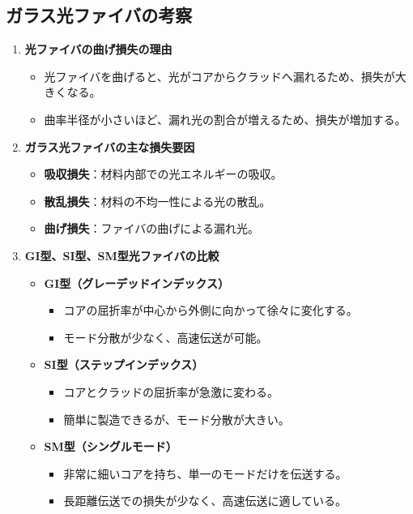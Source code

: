 \documentclass[a4paper,11pt,xelatex,ja=standard]{bxjsarticle}
\begin{document}
\subsection{ガラス光ファイバの考察}

\begin{enumerate}

    \item \textbf{光ファイバの曲げ損失の理由}
    \begin{itemize}
        \item 光ファイバを曲げると、光がコアからクラッドへ漏れるため、損失が大きくなる。
        \item 曲率半径が小さいほど、漏れ光の割合が増えるため、損失が増加する。
    \end{itemize}

    \item \textbf{ガラス光ファイバの主な損失要因}
    \begin{itemize}
        \item \textbf{吸収損失}：材料内部での光エネルギーの吸収。
        \item \textbf{散乱損失}：材料の不均一性による光の散乱。
        \item \textbf{曲げ損失}：ファイバの曲げによる漏れ光。
    \end{itemize}

    \item \textbf{GI型、SI型、SM型光ファイバの比較}
    \begin{itemize}
        \item \textbf{GI型（グレーデッドインデックス）}
        \begin{itemize}
            \item コアの屈折率が中心から外側に向かって徐々に変化する。
            \item モード分散が少なく、高速伝送が可能。
        \end{itemize}
        \item \textbf{SI型（ステップインデックス）}
        \begin{itemize}
            \item コアとクラッドの屈折率が急激に変わる。
            \item 簡単に製造できるが、モード分散が大きい。
        \end{itemize}
        \item \textbf{SM型（シングルモード）}
        \begin{itemize}
            \item 非常に細いコアを持ち、単一のモードだけを伝送する。
            \item 長距離伝送での損失が少なく、高速伝送に適している。
        \end{itemize}
    \end{itemize}
\end{enumerate}
\end{document}
